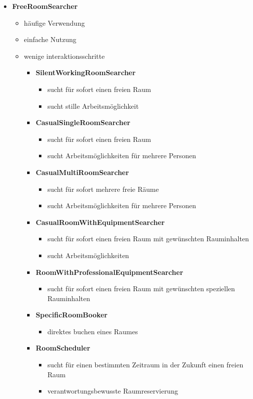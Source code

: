 
\begin{itemize}
	\item \textbf{FreeRoomSearcher}
	\begin{itemize}
		\item häufige Verwendung
		\item einfache Nutzung
		\item wenige interaktionsschritte
		\begin{itemize}
			\item \textbf{SilentWorkingRoomSearcher}
			\begin{itemize}
				\item sucht für sofort einen freien Raum
            	\item sucht stille Arbeitsmöglichkeit
			\end{itemize}
			\item \textbf{CasualSingleRoomSearcher}
			\begin{itemize}
				\item sucht für sofort einen freien Raum
            	\item sucht Arbeitsmöglichkeiten für mehrere Personen
			\end{itemize}
			\item \textbf{CasualMultiRoomSearcher}
			\begin{itemize}
				\item sucht für sofort mehrere freie Räume
            	\item sucht Arbeitsmöglichkeiten für mehrere Personen
			\end{itemize}
			\item \textbf{CasualRoomWithEquipmentSearcher}
			\begin{itemize}
				\item sucht für sofort einen freien Raum mit gewünschten Rauminhalten
            	\item sucht Arbeitsmöglichkeiten
			\end{itemize}
			\item \textbf{RoomWithProfessionalEquipmentSearcher}
			\begin{itemize}
				\item sucht für sofort einen freien Raum mit gewünschten speziellen Rauminhalten
			\end{itemize}
			\item \textbf{SpecificRoomBooker}
			\begin{itemize}
				\item direktes buchen eines Raumes
			\end{itemize}
			\item \textbf{RoomScheduler}
			\begin{itemize}
				\item sucht für einen bestimmten Zeitraum in der Zukunft einen freien Raum
				\item verantwortungsbewusste Raumreservierung
			\end{itemize}
		\end{itemize}
	\end{itemize}
	

\end{itemize}
